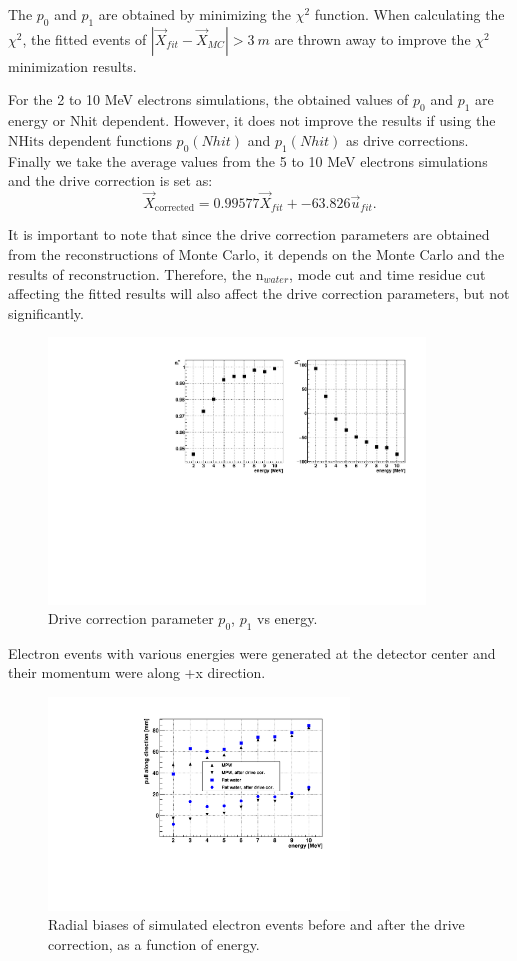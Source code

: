 The $p_0$ and $p_1$ are obtained by minimizing the $\chi^2$ function. When calculating the $\chi^2$, the fitted events of $|\vec{X}_{fit}-\vec{X}_{MC}|>3~m$ are thrown away to improve the $\chi^2$ minimization results.

For the 2 to 10 MeV electrons simulations, the obtained values of $p_0$ and $p_1$ are energy or Nhit dependent. However, it does not improve the results if using the $\mathrm{NHits}$ dependent functions $p_0(Nhit)$ and $p_1(Nhit)$ as drive corrections.
Finally we take the average values from the 5 to 10 MeV electrons simulations and the drive correction is set as: 
\begin{equation}
\vec{X}_{\mathrm{corrected}} = 0.99577\vec{X}_{fit}+-63.826\vec{u}_{fit}.
\end{equation}

It is important to note that since the drive correction parameters are obtained from the reconstructions of Monte Carlo, it depends on the Monte Carlo and the results of reconstruction. Therefore, the n$_{water}$, mode cut and time residue cut affecting the fitted results will also affect the drive correction parameters, but not significantly.


\begin{figure}[!htb]
	\centering
	\includegraphics[width=10cm]{pullParVsEnergy.pdf}
	\caption{ Drive correction parameter $p_0$, $p_1$ vs energy.}
	\label{pullParVsEnergy}
\end{figure}

Electron events with various energies were generated at the detector center and their momentum were along +x direction. 

\begin{figure}[!htb]
	\centering
	\includegraphics[width=8cm]{pullEffectVsEnergy.pdf}
	\caption{ Radial biases of simulated electron events before and after the drive correction, as a function of energy.}
	\label{drivecorVsEnergy}
\end{figure}

